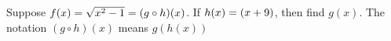
%
%
%
%      
% 
% 
%   



\SQUARE{\vbtwo}{\n}
\gcalcexpr[0]\p{-(\vbone - \n)}

\question[4] Suppose $f(x) = \sqrt{x^2 - 1} = (g \circ h)(x)$. If $h(x) = (x + 9)$, 
then find $g(x)$. The notation $(g\circ h)(x)$ means $g(h(x))$


\watchout

